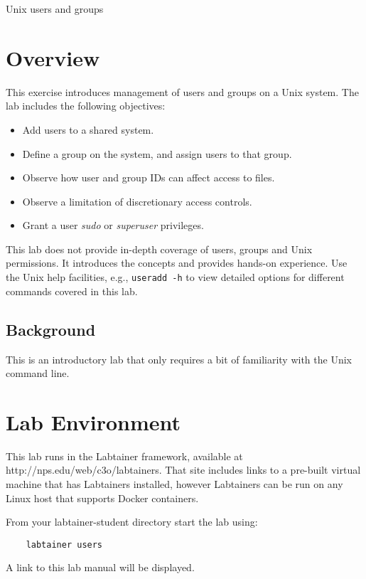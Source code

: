 


\begin{center}
{\LARGE Unix users and groups}
\vspace{0.1in}\\
\end{center}


\section{Overview}
This exercise introduces management of users and groups on a Unix system.  
The lab includes the following objectives:
\begin{itemize}
\item Add users to a shared system.
\item Define a group on the system, and assign users to that group.
\item Observe how user and group IDs can affect access to files.
\item Observe a limitation of discretionary access controls.
\item Grant a user \textit{sudo} or \textit{superuser} privileges.
\end{itemize}

This lab does not provide in-depth coverage of users, groups and Unix permissions.  It introduces the concepts
and provides hands-on experience.  Use the Unix help facilities, e.g., {\tt useradd -h} to view detailed options
for different commands covered in this lab.

\subsection{Background}
This is an introductory lab that only requires a bit of familiarity with the Unix command line.

\section{Lab Environment}
This lab runs in the Labtainer framework,
available at http://nps.edu/web/c3o/labtainers.
That site includes links to a pre-built virtual machine
that has Labtainers installed, however Labtainers can
be run on any Linux host that supports Docker containers.

From your labtainer-student directory start the lab using:
\begin{verbatim}
    labtainer users
\end{verbatim}
A link to this lab manual will be displayed.

